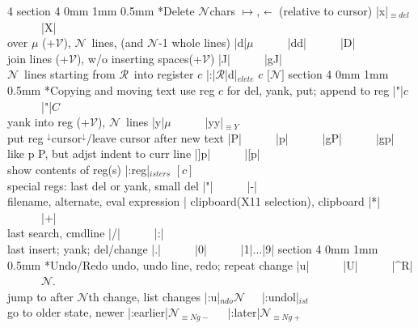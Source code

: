 \documentclass[10pt,a4paper,landscape]{article}
\makeatletter
\renewcommand{\subsection}{\@startsection
	{section}
	{4}
	{0mm}
	{1mm}
	{0.5mm}
	{\normalfont\bfseries\scriptsize}}
\newcommand{\toleft}{$\shortleftarrow$}
\newcommand{\toend}{{\small\ForwardToEnd}}
\newcommand{\eqv}[1]{$_{\equiv #1}$}
\newcommand{\opt}[1]{$_{#1}$}
\newcommand{\after}[1]{#1$^\downarrow$}
\newcommand{\before}[1]{ $^\downarrow$#1}
\newcommand{\N}{{\footnotesize$\mathcal{N}$}}
\newcommand{\R}{{\footnotesize$\mathcal{R}$}}
\newcommand{\V}{{\footnotesize$\mathcal{V}$}}
\newcommand{\w}{{~~~}}
\newcommand{\indy}{\hspace*{0.5cm}}
\newcommand{\next}{{\small\leftpointright}}
\makeatother
\begin{document}
\begin{multicols}{4}
{{\subsection*{Delete}
\N chars $\mapsto$, \toleft~(relative to cursor)    \dotfill|x|\eqv{del}\w\w|X|\\
over $\mu$ (+\V), \N~lines, \toend (and \N-1 whole lines)	\dotfill|d|$\mu$\w\w|dd|\w\w|D|\\
join lines (+\V), w/o inserting spaces(+\V)	    \dotfill|J|\w\w|gJ|\\
\N~lines starting from \R~into register $c$	    \dotfill|:|\R|d|\opt{elete} $c$ $[$\N$]$
\subsection*{Copying and moving text}
use reg $c$ for \next del, yank, put; append to reg	\dotfill|"|$c$\w\w|"|$C$\\
yank into reg (+\V), \N~lines				\dotfill|y|$\mu$\w\w|yy|\eqv{Y}\\
put reg \before{cursor}\after{}/leave cursor after new text \dotfill|P|\w\w|p|\w\w|gP|\w\w|gp|\\
like p P, but adjst indent to curr line			\dotfill|]p|\w\w|[p|\\
show contents of reg(s)					\dotfill|:reg|\opt{isters} $[c]$\\
special regs: last del or yank, small del   \dotfill|"|\w\w|-|\\
{\indy}filename, alternate, eval expression \dotfill|%
{\indy}clipboard(X11 selection), clipboard  \dotfill|*|\w\w|+|\\
{\indy}last search, cmdline		    \dotfill|/|\w\w|:|\\
{\indy}last insert; yank; del/change	    \dotfill|.|\w\w|0|\w\w|1|...|9|
\subsection*{Undo/Redo}
undo, undo line, redo; repeat change		\dotfill|u|\w\w|U|\w\w|^R|\w\w\N.\\
jump to after {\N}th change, list changes	\dotfill|:u|\opt{ndo}\N\w|:undol|\opt{ist}\\
go to older state, newer			\dotfill|:earlier|\N\eqv{Ng-}\w|:later|\N\eqv{Ng+}
}}
\end{multicols}
\end{document}
